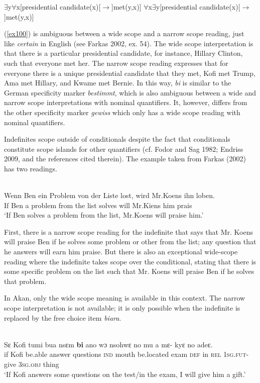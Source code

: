 \documentclass[output=paper,modfonts]{langsci/langscibook}
\begin{document}
 \ea
 \ea
$\exists$y$\forall$x[presidential candidate(x)[$\rightarrow$]met(y,x)]
\ex $\forall$x$\exists$y[presidential candidate(x)[$\rightarrow$]met(y,x)] 
\z\z

(\ref{ex100}) is ambiguous between a wide scope and a narrow scope reading, just like \emph{certain} in English  (see Farkas 2002, ex. 54). The wide scope interpretation is that there is a particular presidential candidate, for instance, Hillary Clinton, such that everyone met her. The narrow scope reading expresses that for everyone there is a unique presidential candidate that they met, Kofi met Trump, Ama met Hillary, and Kwame met Bernie. In this way, \emph{bi} is similar to the German specificity marker \emph{bestimmt}, which is also ambiguous between a wide and narrow scope interpretations with nominal quantifiers. It, however, differs from the other specificity marker \emph{gewiss} which only has a wide scope reading with nominal quantifiers.               
  
  Indefinites scope outside of conditionals despite the fact that conditionals constitute scope islands for other quantifiers (cf. Fodor and Sag 1982; Endriss 2009, and the references cited therein). The example taken from Farkas (2002) has two readings.

\ea\label{ex14}\\
\gll Wenn Ben ein Problem von der Liste lost, wird Mr.Koens ihn loben. \\
    If Ben a problem from the list solves will Mr.Kiens him prais\\
\glt `If Ben solves a problem from the list, Mr.Koens will praise him.'
\z

First, there is a narrow scope reading for the indefinite that says that  Mr. Koens will praise Ben if he solves some problem or other from the list; any question that he answers will earn him praise. But there is also an exceptional wide-scope reading where the indefinite takes scope over the conditional, stating that there is some specific problem on the list such that Mr. Koens will praise Ben if he solves that problem. 

In Akan, only the wide scope meaning is available in this context. The narrow scope interpretation is not available; it is only possible when the indefinite is replaced by the free choice item \emph{biara}.



\ea\label{ex15} \\
\gll  Sε Kofi tumi bua nsεm \textbf{bi} ano wɔ nsohwε no mu a mε- kyε no adeε.\\
 if Kofi be.able answer questions \textsc{ind} mouth be.located exam \textsc{def} in \textsc{rel} \textsc{1sg.fut}- give 3\textsc{sg}.\textsc{obj} thing \\
\glt `If Kofi answers some questions on the test/in the exam, I will give him a gift.'
\z 
\end{document}
